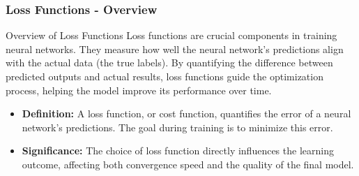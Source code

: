 \documentclass[aspectratio=169]{beamer}
\begin{document}
\begin{frame}[fragile]
    \frametitle{Loss Functions - Overview}
    \begin{block}{Overview of Loss Functions}
        Loss functions are crucial components in training neural networks. They measure how well the neural network's predictions align with the actual data (the true labels). By quantifying the difference between predicted outputs and actual results, loss functions guide the optimization process, helping the model improve its performance over time.
    \end{block}
    
    \begin{itemize}
        \item \textbf{Definition:} A loss function, or cost function, quantifies the error of a neural network's predictions. The goal during training is to minimize this error.
        \item \textbf{Significance:} The choice of loss function directly influences the learning outcome, affecting both convergence speed and the quality of the final model.
    \end{itemize}
\end{frame}
\end{document}

